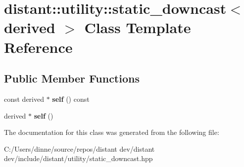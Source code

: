 \hypertarget{classdistant_1_1utility_1_1static__downcast}{}\section{distant\+:\+:utility\+:\+:static\+\_\+downcast$<$ derived $>$ Class Template Reference}
\label{classdistant_1_1utility_1_1static__downcast}
\subsection*{Public Member Functions}
\begin{DoxyCompactItemize}
\item 
\mbox{\label{classdistant_1_1utility_1_1static__downcast_aa6837097d259a39129fab430e0fb9f40}} 
const derived $\ast$ {\bfseries self} () const
\item 
\mbox{\label{classdistant_1_1utility_1_1static__downcast_a3178f691b633ebaabefb87a221bace63}} 
derived $\ast$ {\bfseries self} ()
\end{DoxyCompactItemize}


The documentation for this class was generated from the following file\+:\begin{DoxyCompactItemize}
\item 
C\+:/\+Users/dinne/source/repos/distant dev/distant dev/include/distant/utility/static\+\_\+downcast.\+hpp\end{DoxyCompactItemize}
